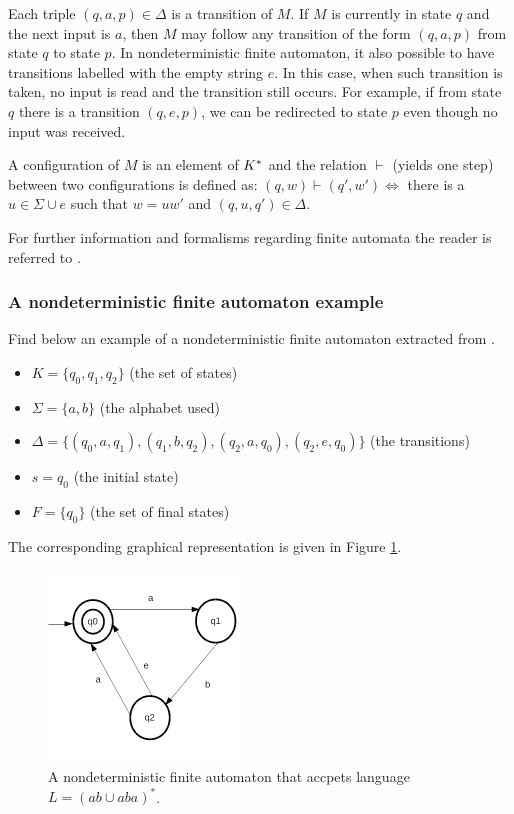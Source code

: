 Each triple $(q,a,p) \in \Delta$ is a transition of $M$. If $M$ is currently in state $q$ and the next input is $a$, then $M$ may follow any transition of the form $(q,a,p)$ from state $q$ to state $p$. In nondeterministic finite automaton, it also possible to have transitions labelled with the empty string $e$. In this case, when such transition is taken, no input is read and the transition still occurs. For example, if from state $q$ there is a transition $(q,e,p)$, we can be redirected to state $p$ even though no input was received.

A configuration of $M$ is an element of $K\time \Sigma^*$ and the relation $\vdash$ (yields one step) between two configurations is defined as: $(q,w) \vdash (q',w') \Leftrightarrow$ there is a $u \in \Sigma \cup {e}$ such that $w = uw'$ and $(q,u,q') \in \Delta$.

For further information and formalisms regarding finite automata the reader is referred to \cite{Lewis:98}. 

\subsubsection{A nondeterministic finite automaton example}

Find below an example of a nondeterministic finite automaton extracted from \cite{Lewis:98}.

\begin{itemize}
\item $K = \{q_0, q_1, q_2\}$ (the set of states)

\item $\Sigma = \{a, b\}$ (the alphabet used)

\item $\Delta = \{(q_0,a,q_1),(q_1,b,q_2),(q_2,a,q_0),(q_2,e,q_0)\}$ (the transitions)

\item $s = q_0$ (the initial state)

\item $F = \{q_0\}$ (the set of final states)
\end{itemize}

The corresponding graphical representation is given in Figure \ref{fig:nfa1}.

\begin{figure}[htb]
\centering
\includegraphics[width=2in]{figuras/nfa1}
\caption{\label{fig:nfa1}A nondeterministic finite automaton that accpets language $L = (ab \cup aba)^{*}$.}
\end{figure}

